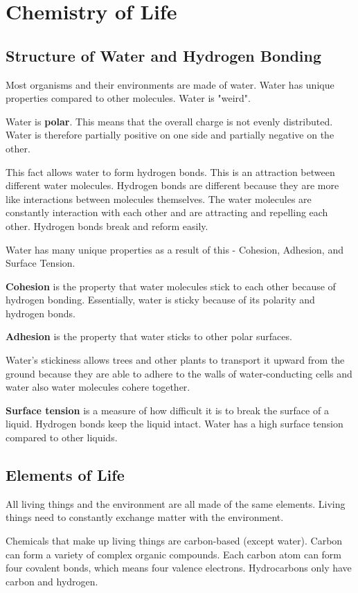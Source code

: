 \documentclass[../bio.tex]{subfiles}
\begin{document}
\chapter{Chemistry of Life}
\section{Structure of Water and Hydrogen Bonding}
Most organisms and their environments are made of water. Water has unique properties compared to other molecules. Water is "weird".

Water is \textbf{polar}. This means that the overall charge is not evenly distributed. Water is therefore partially positive on one side and partially negative on the other.

This fact allows water to form hydrogen bonds. This is an attraction between different water molecules. 
Hydrogen bonds are different because they are more like interactions between molecules themselves. 
The water molecules are constantly interaction with each other and are attracting and repelling each other. 
Hydrogen bonds break and reform easily.

Water has many unique properties as a result of this -  Cohesion, Adhesion, and Surface Tension.

\textbf{Cohesion} is the property that water molecules stick to each other because of hydrogen bonding.
Essentially, water is sticky because of its polarity and hydrogen bonds.

\textbf{Adhesion} is the property that water sticks to other polar surfaces. 

Water's stickiness allows trees and other plants to transport it upward from the ground because they are able to adhere to the walls of water-conducting cells and water also water molecules cohere together.
 
\textbf{Surface tension} is a measure of how difficult it is to break the surface of a liquid. Hydrogen bonds keep the liquid intact. Water has a high surface tension compared to other liquids.

\section{Elements of Life}
All living things and the environment are all made of the same elements. Living things need to constantly exchange matter with the environment. 

Chemicals that make up living things are carbon-based (except water). Carbon can form a variety of complex organic compounds. Each carbon atom can form four covalent bonds, which means four valence electrons. Hydrocarbons only have carbon and hydrogen. 
\end{document}

